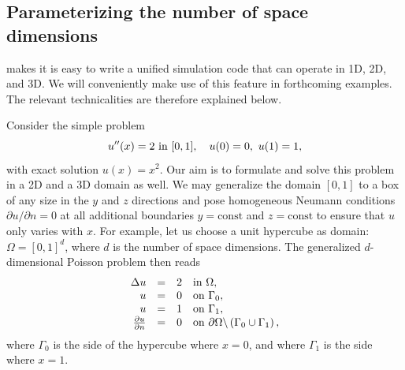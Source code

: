 \subsection{Parameterizing the number of space dimensions}
\label{langtangen:poisson:nD}

\fenics{} makes it is easy to write a unified simulation code that can operate
in 1D, 2D, and 3D. We will conveniently make use of this feature in
forthcoming examples. The relevant technicalities are therefore explained
below.

Consider the simple problem
\begin{equation}
u''(x) = 2\hbox{ in }[0,1],\quad u(0)=0,\ u(1)=1,
\end{equation}
with exact solution $u(x)=x^2$. Our aim is to formulate and solve this
problem in a 2D and a 3D domain as well.
We may generalize the domain $[0,1]$ to a box of any size
in the $y$ and $z$ directions and pose homogeneous Neumann
conditions $\partial u/\partial n = 0$ at all additional boundaries
$y=\mbox{const}$ and $z=\mbox{const}$ to ensure that $u$ only varies with
$x$. For example, let us choose
a unit hypercube as domain: $\Omega = [0,1]^d$, where $d$ is the number
of space dimensions. The generalized $d$-dimensional Poisson problem
then reads
\begin{equation} \label{langtangen:poisson1:ddim}
  \begin{array}{rcll}
    \Delta u &=& 2 &\mbox{in } \Omega, \\
    u &=& 0 &\mbox{on } \Gamma_0,\\
    u &=& 1 &\mbox{on } \Gamma_1,\\
{\partial u\over\partial n} &=& 0 &\mbox{on } \partial\Omega\backslash\left(
\Gamma_0\cup\Gamma_1\right),
  \end{array}
\end{equation}
where $\Gamma_0$ is the side of the hypercube where $x=0$, and
where $\Gamma_1$ is the side where $x=1$.

